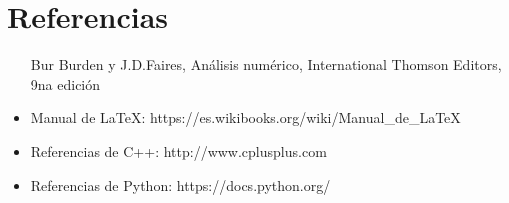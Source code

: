 \section{Referencias}

\begin{itemize}
\item [Bur] Burden y J.D.Faires, Análisis numérico, International Thomson Editors, 9na edición
\item Manual de LaTeX: https://es.wikibooks.org/wiki/Manual_de_LaTeX
\item Referencias de C++: http://www.cplusplus.com
\item Referencias de Python: https://docs.python.org/
\end{itemize}